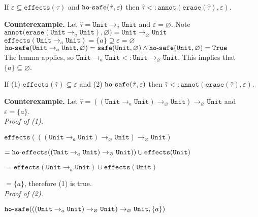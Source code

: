 \documentclass{llncs}
\newcommand{\keywadj}[1]{\mathtt{#1}}
\newcommand{\kwa}[1]{\keywadj{ #1 }}
\newcommand{\hyphen}{\hbox{-}}
\newcommand{\Unit}[0]{ \kwa{Unit} }
\newcommand{\fx}[1]{ \kwa{effects}(#1) }
\newcommand{\hofx}[1]{ \kwa{ho \hyphen effects}(#1) }
\newcommand{\hosafe}[2]{ \kwa{ho \hyphen safe}(#1, #2) }
\begin{document}
\begin{lemma}
If $\varepsilon \subseteq \kwa{effects}(\hat \tau)$ and $\kwa{ho \hyphen safe}(\hat \tau, \varepsilon)$ then $\hat \tau <: \kwa{annot}(\kwa{erase}(\hat \tau), \varepsilon)$.
\end{lemma}

\noindent
\textbf{Counterexample.} Let $\hat \tau = \Unit \rightarrow_{a} \Unit$ and $\varepsilon = \varnothing$. Note $\kwa{annot(erase}(\Unit \rightarrow_{a} \Unit), \varnothing) = \Unit \rightarrow_{\varnothing} \Unit$ \\

\noindent
$\kwa{effects}(\Unit \rightarrow_{a} \Unit) = \{ a \}\supseteq \varepsilon = \varnothing$ \\

\noindent
$\kwa{ho \hyphen safe}(\Unit \rightarrow_{a} \Unit, \varnothing) = \kwa{safe}(\Unit, \varnothing) \land \kwa{ho \hyphen safe}(\Unit, \varnothing) = \kwa{True}$ \\

\noindent
The lemma applies, so $\Unit \rightarrow_{a} \Unit <: \Unit \rightarrow_{\varnothing} \Unit$. This implies that $\{ a \} \subseteq \varnothing$. \\

\hrulefill


\begin{lemma}
If (1) $\kwa{effects}(\hat \tau) \subseteq \varepsilon$ and (2) $\kwa{ho \hyphen safe}(\hat \tau, \varepsilon)$ then $\hat \tau <: \kwa{annot}(\kwa{erase}(\hat \tau), \varepsilon)$.
\end{lemma}

\noindent
\textbf{Counterexample.}  Let $\hat \tau = ((\Unit \rightarrow_{a} \Unit) \rightarrow_{\varnothing} \Unit) \rightarrow_{\varnothing} \Unit$ and $\varepsilon = \{ a \}$. \\

\noindent
\textit{Proof of (1).}

	$\fx{((\Unit \rightarrow_{a} \Unit) \rightarrow_{\varnothing} \Unit) \rightarrow_{\varnothing} \Unit}$
	
	$= \hofx{(\Unit \rightarrow_{a} \Unit) \rightarrow_{\varnothing} \Unit)} \cup \fx{\Unit} $
	
	$= \fx{\Unit \rightarrow_{a} \Unit} \cup \fx{\Unit}$
	
	$= \{ a \}$, therefore (1) is true. \\
	
\noindent
\textit{Proof of (2).}

	$\hosafe{((\Unit \rightarrow_{a} \Unit) \rightarrow_{\varnothing} \Unit) \rightarrow_{\varnothing} \Unit}{\{ a \}}$
	
\end{document}
